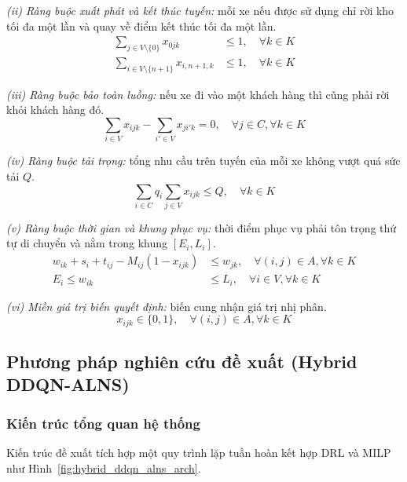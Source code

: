 \documentclass[13pt,a4paper]{extarticle}
\begin{document}
\noindent\textit{(ii) Ràng buộc xuất phát và kết thúc tuyến:} mỗi xe nếu được sử dụng chỉ rời kho tối đa một lần và quay về điểm kết thúc tối đa một lần.
\begin{align}
\sum_{j \in V \setminus \{0\}} x_{0jk} &\le 1, \quad \forall k \in K \\
\sum_{i \in V \setminus \{n+1\}} x_{i,n+1,k} &\le 1, \quad \forall k \in K
\end{align}

\noindent\textit{(iii) Ràng buộc bảo toàn luồng:} nếu xe đi vào một khách hàng thì cũng phải rời khỏi khách hàng đó.
\begin{equation}
\sum_{i \in V} x_{ijk} - \sum_{i' \in V} x_{ji'k} = 0, \quad \forall j \in C, \forall k \in K
\end{equation}

\noindent\textit{(iv) Ràng buộc tải trọng:} tổng nhu cầu trên tuyến của mỗi xe không vượt quá sức tải $Q$.
\begin{equation}
\sum_{i \in C} q_i \sum_{j \in V} x_{ijk} \le Q, \quad \forall k \in K
\end{equation}

\noindent\textit{(v) Ràng buộc thời gian và khung phục vụ:} thời điểm phục vụ phải tôn trọng thứ tự di chuyển và nằm trong khung $[E_i,L_i]$.
\begin{align}
w_{ik} + s_i + t_{ij} - M_{ij} (1 - x_{ijk}) &\le w_{jk}, \quad \forall (i, j) \in A, \forall k \in K \\
E_i \le w_{ik} &\le L_i, \quad \forall i \in V, \forall k \in K
\end{align}

\noindent\textit{(vi) Miền giá trị biến quyết định:} biến cung nhận giá trị nhị phân.
\begin{equation}
x_{ijk} \in \{0, 1\}, \quad \forall (i, j) \in A, \forall k \in K
\end{equation}
\clearpage
\subsection{Phương pháp nghiên cứu đề xuất (Hybrid DDQN-ALNS)}
\subsubsection{Kiến trúc tổng quan hệ thống}

Kiến trúc đề xuất tích hợp một quy trình lặp tuần hoàn kết hợp DRL và MILP như Hình~\ref{fig:hybrid_ddqn_alns_arch}.
\end{document}
